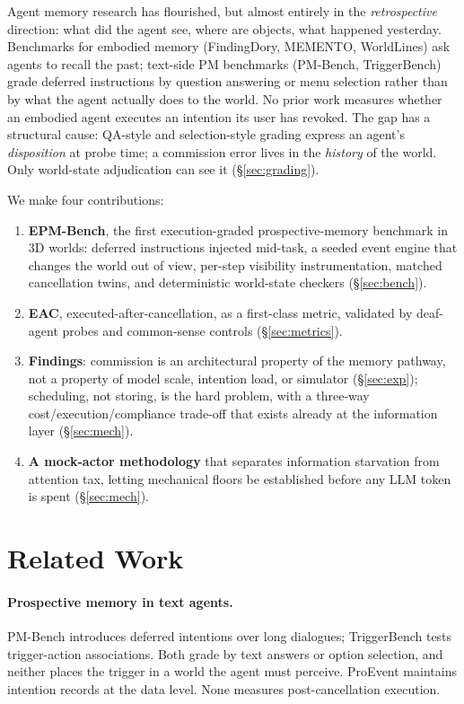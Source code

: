 \documentclass[10pt]{article}
\begin{document}
Agent memory research has flourished, but almost entirely in the
\emph{retrospective} direction: what did the agent see, where are objects,
what happened yesterday. Benchmarks for embodied memory
(FindingDory, MEMENTO, WorldLines) ask agents to recall the past;
text-side PM benchmarks (PM-Bench, TriggerBench) grade deferred
instructions by question answering or menu selection rather than by what
the agent actually does to the world. No prior work measures whether an
embodied agent executes an intention its user has revoked. The gap has a
structural cause: QA-style and selection-style grading express an agent's
\emph{disposition} at probe time; a commission error lives in the
\emph{history} of the world. Only world-state adjudication can see it
(\S\ref{sec:grading}).

We make four contributions:
\begin{enumerate}
  \item \textbf{EPM-Bench}, the first execution-graded prospective-memory
  benchmark in 3D worlds: deferred instructions injected mid-task, a
  seeded event engine that changes the world out of view, per-step
  visibility instrumentation, matched cancellation twins, and
  deterministic world-state checkers (\S\ref{sec:bench}).
  \item \textbf{EAC}, executed-after-cancellation, as a first-class
  metric, validated by deaf-agent probes and common-sense controls
  (\S\ref{sec:metrics}).
  \item \textbf{Findings}: commission is an architectural property of the
  memory pathway, not a property of model scale, intention load, or
  simulator (\S\ref{sec:exp}); scheduling, not storing, is the hard
  problem, with a three-way cost/execution/compliance trade-off that
  exists already at the information layer (\S\ref{sec:mech}).
  \item \textbf{A mock-actor methodology} that separates information
  starvation from attention tax, letting mechanical floors be established
  before any LLM token is spent (\S\ref{sec:mech}).
\end{enumerate}

\section{Related Work}

\paragraph{Prospective memory in text agents.} PM-Bench introduces
deferred intentions over long dialogues; TriggerBench tests trigger-action
associations. Both grade by text answers or option selection, and neither
places the trigger in a world the agent must perceive. ProEvent maintains
intention records at the data level. None measures post-cancellation
execution.
\end{document}
